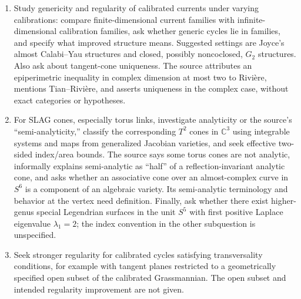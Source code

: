 \documentclass[11pt]{article}
\newcommand{\C}{\mathbb{C}}
\begin{document}
\begin{enumerate}
\item Study genericity and regularity of calibrated currents under varying calibrations: compare finite-dimensional current families with infinite-dimensional calibration families, ask whether generic cycles lie in families, and specify what improved structure means. Suggested settings are Joyce's almost Calabi--Yau structures and closed, possibly noncoclosed, \(G_2\) structures. Also ask about tangent-cone uniqueness. The source attributes an epiperimetric inequality in complex dimension at most two to Rivi\`ere, mentions Tian--Rivi\`ere, and asserts uniqueness in the complex case, without exact categories or hypotheses.
\item For SLAG cones, especially torus links, investigate analyticity or the source's ``semi-analyticity,'' classify the corresponding \(T^2\) cones in \(\C^3\) using integrable systems and maps from generalized Jacobian varieties, and seek effective two-sided index/area bounds. The source says some torus cones are not analytic, informally explains semi-analytic as ``half'' of a reflection-invariant analytic cone, and asks whether an associative cone over an almost-complex curve in \(S^6\) is a component of an algebraic variety. Its semi-analytic terminology and behavior at the vertex need definition. Finally, ask whether there exist higher-genus special Legendrian surfaces in the unit \(S^5\) with first positive Laplace eigenvalue \(\lambda_1=2\); the index convention in the other subquestion is unspecified.
\item Seek stronger regularity for calibrated cycles satisfying transversality conditions, for example with tangent planes restricted to a geometrically specified open subset of the calibrated Grassmannian. The open subset and intended regularity improvement are not given.
\end{enumerate}
\end{document}
